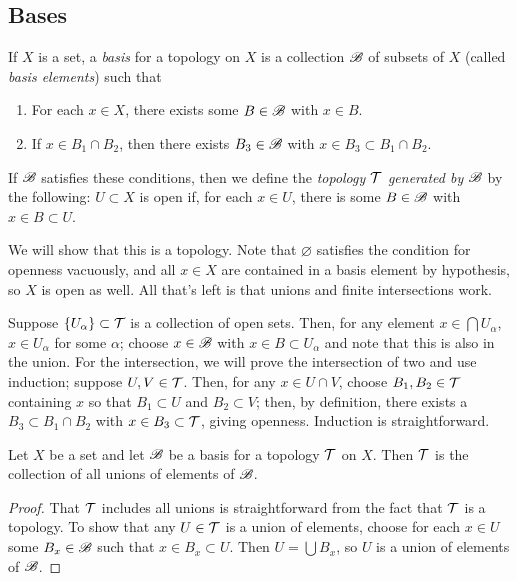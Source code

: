 \documentclass[10pt]{report}
\begin{document}
\subsection{Bases}
\begin{definition}
  If $X$ is a set, a \emph{basis} for a topology on $X$ is a collection $\mathscr{B}$ of subsets of $X$ (called \emph{basis elements}) such that
  \begin{enumerate}[label={(\arabic*)}]
    \item For each $x \in X$, there exists some $B \in \mathscr{B}$ with $x \in B$.
    \item If $x \in B_1 \cap B_2$, then there exists $B_3 \in \mathscr{B}$ with $x \in B_3 \subset B_1 \cap B_2$.
  \end{enumerate}
  
  If $\mathscr{B}$ satisfies these conditions, then we define the \emph{topology $\mathcal{T}$ generated by $\mathscr{B}$} by the following:
  $U \subset X$ is open if, for each $x \in U$, there is some $B \in \mathscr{B}$ with $x \in B \subset U$.
\end{definition}

  We will show that this is a topology.
  Note that $\varnothing$ satisfies the condition for openness vacuously, and all $x \in X$ are contained in a basis element by hypothesis, so $X$ is open as well.
  All that's left is that unions and finite intersections work.

  Suppose $\{U_\alpha\} \subset \mathcal{T}$ is a collection of open sets.
  Then, for any element $x \in \bigcap U_\alpha$, $x \in U_\alpha$ for some $\alpha$; choose $x \in \mathscr{B}$ with $x \in B \subset U_\alpha$ and note that this is also in the union.
  For the intersection, we will prove the intersection of two and use induction; suppose $U,V \in \mathcal{T}$.
  Then, for any $x \in U \cap V$, choose $B_1,B_2 \in \mathcal{T}$ containing $x$ so that $B_1 \subset U$ and $B_2 \subset V$; then, by definition, there exists a $B_3 \subset B_1 \cap B_2$ with $x \in B_3 \subset \mathcal{T}$, giving openness.
  Induction is straightforward.

  \begin{lemma}
    Let $X$ be a set and let $\mathscr{B}$ be a basis for a topology $\mathcal{T}$ on $X$.
    Then $\mathcal{T}$ is the collection of all unions of elements of $\mathscr{B}$.
  \end{lemma}
  \begin{proof}
    That $\mathcal{T}$ includes all unions is straightforward from the fact that $\mathcal{T}$ is a topology.
    To show that any $U \in \mathcal{T}$ is a union of elements, choose for each $x \in U$ some $B_x \in \mathscr{B}$ such that $x \in B_x \subset U$.
    Then $U = \bigcup B_x$, so $U$ is a union of elements of $\mathscr{B}$.
  \end{proof}
\end{document}
